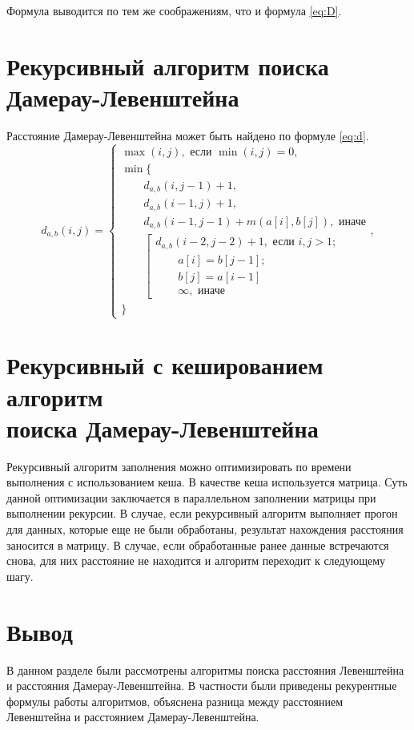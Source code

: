 Формула выводится по тем же соображениям, что и формула \ref{eq:D}.

\section{Рекурсивный алгоритм поиска \\Дамерау-Левенштейна}
\label{sec:recmat}

Расстояние Дамерау-Левенштейна может быть найдено по формуле \ref{eq:d}.
\begin{equation}
	\label{eq:d}
	d_{a,b}(i, j) = \begin{cases}
		\max(i, j), \text{ если }\min(i, j) = 0,\\
		\min \lbrace \\
			\qquad d_{a,b}(i, j-1) + 1,\\
			\qquad d_{a,b}(i-1, j) + 1,\\
			\qquad d_{a,b}(i-1, j-1) + m(a[i], b[j]), \text{ иначе}\\
			\qquad \left[ \begin{array}{cc}d_{a,b}(i-2, j-2) + 1, \text{ если }i,j > 1;\\
			\qquad \text{}a[i] = b[j-1]; \\
			\qquad \text{}b[j] = a[i-1]\\
			\qquad \infty,  \text{ иначе}\end{array}\right.\\
		\rbrace
		\end{cases},
\end{equation}

\section{Рекурсивный с кешированием алгоритм \\ поиска Дамерау-Левенштейна}

Рекурсивный алгоритм заполнения можно оптимизировать по времени выполнения с использованием кеша. В качестве кеша используется матрица. Суть данной оптимизации заключается в параллельном заполнении матрицы при выполнении рекурсии. 
В случае, если рекурсивный алгоритм выполняет прогон для данных, которые еще не были обработаны, результат нахождения расстояния заносится в матрицу. В случае, если обработанные ранее данные встречаются снова, для них расстояние не находится и алгоритм переходит к следующему шагу.


\section*{Вывод}

В данном разделе были рассмотрены алгоритмы поиска расстояния Левенштейна и расстояния Дамерау-Левенштейна. В частности были приведены рекурентные формулы работы алгоритмов, объяснена разница между расстоянием Левенштейна и расстоянием Дамерау-Левенштейна.

